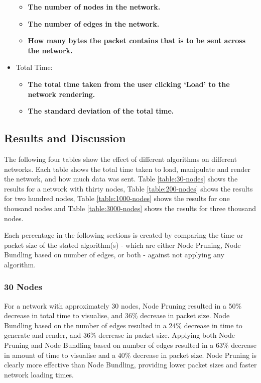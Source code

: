 \documentclass[../dissertation.tex]{subfiles}
\begin{document}
\begin{itemize}
    \begin{itemize}
        \item \textbf{The number of nodes in the network.}
        \item \textbf{The number of edges in the network.}
        \item \textbf{How many bytes the packet contains that is to be sent across the network.}
    \end{itemize}
    \item Total Time:
    \begin{itemize}
        \item \textbf{The total time taken from the user clicking `Load' to the network rendering.}
        \item \textbf{The standard deviation of the total time.}
    \end{itemize}
\end{itemize}

\subsection{Results and Discussion}

The following four tables show the effect of different algorithms on different networks. Each table shows the total time taken to load, manipulate and render the network, and how much data was sent. Table \ref{table:30-nodes} shows the results for a network with thirty nodes, Table \ref{table:200-nodes} shows the results for two hundred nodes, Table \ref{table:1000-nodes} shows the results for one thousand nodes and Table \ref{table:3000-nodes} shows the results for three thousand nodes. 

Each percentage in the following sections is created by comparing the time or packet size of the stated algorithm(s) - which are either Node Pruning, Node Bundling based on number of edges, or both - against not applying any algorithm.

\subsubsection{30 Nodes}

For a network with approximately 30 nodes, Node Pruning resulted in a 50\% decrease in total time to visualise, and 36\% decrease in packet size. Node Bundling based on the number of edges resulted in a 24\% decrease in time to generate and render, and 36\% decrease in packet size. Applying both Node Pruning and Node Bundling based on number of edges resulted in a 63\% decrease in amount of time to visualise and a 40\% decrease in packet size. Node Pruning is clearly more effective than Node Bundling, providing lower packet sizes and faster network loading times.
\end{document}
